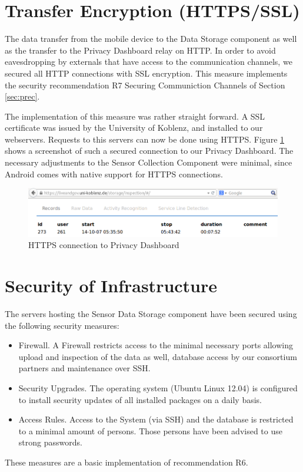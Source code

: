 \section{Transfer Encryption (HTTPS/SSL)}
The data transfer from the mobile device to the Data Storage component
as well as the transfer to the Privacy Dashboard relay on HTTP. In
order to avoid eavesdropping by externals that have access to the
communication channels, we secured all HTTP connections with SSL
encryption. This measure implements the security recommendation R7
Securing Communiction Channels of Section \ref{sec:prec}.

The implementation of this measure was rather straight forward. A SSL
certificate was issued by the University of Koblenz, and installed to
our webservers. Requests to this servers can now be done using HTTPS.
Figure \ref{fig:PDHTTPS} shows a screenshot of such a secured
connection to our Privacy Dashboard. The necessary adjustments to the
Sensor Collection Component were minimal, since Android comes with
native support for HTTPS connections.

\begin{figure}[h]
\includegraphics[width=\textwidth]{screenshots/HTTPS.png}
\caption{HTTPS connection to Privacy Dashboard}
\label{fig:PDHTTPS}
\end{figure}


\section{Security of Infrastructure}
The servers hosting the Sensor Data Storage component have been
secured using the following security measures:
\begin{itemize}
  \item Firewall. A Firewall restricts access to the minimal necessary
    ports allowing upload and inspection of the data as well, database
    access by our consortium partners and maintenance over SSH.
  \item Security Upgrades.  The operating system (Ubuntu Linux 12.04)
    is configured to install security updates of all installed
    packages on a daily basis.
  \item Access Rules. Access to the System (via SSH) and the database
    is restricted to a minimal amount of persons. Those persons have
    been advised to use strong passwords.
\end{itemize}
These measures are a basic implementation of recommendation R6.


